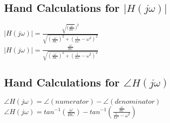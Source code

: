 \documentclass[12pt,a4paper]{article}
\begin{document}
\subsection{Hand Calculations for $|H(j\omega)|$}
\begin{center}
    $|H(j\omega)|=\frac{\sqrt{(\frac{\omega}{RC}})^2}{\sqrt{(\frac{\omega}{RC})^2+(\frac{1}{LC}-\omega^2)^2}}$ \\
    $|H(j\omega)|=\frac{\frac{\omega}{RC}}{\sqrt{(\frac{\omega}{RC})^2+(\frac{1}{LC}-\omega^2)^2}}$
\end{center}
\subsection{Hand Calculations for $\angle H(j\omega)$}
\begin{center}
    $\angle H(j\omega)=\angle(numerator)-\angle(denominator)$\\
    $\angle H(j\omega)=tan^{-1}(\frac{\omega}{RC})-tan^{-1}(\frac{\frac{\omega}{RC}}{\frac{1}{LC}-\omega^2})$\\
\end{center}
\end{document}
